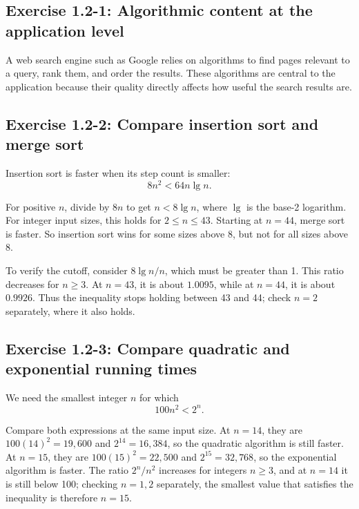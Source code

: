 \documentclass[11pt]{article}
\begin{document}
\subsection*{Exercise 1.2-1: Algorithmic content at the application level}

A web search engine such as Google relies on algorithms to find pages relevant
to a query, rank them, and order the results. These algorithms are central to
the application because their quality directly affects how useful the search
results are.

\subsection*{Exercise 1.2-2: Compare insertion sort and merge sort}

Insertion sort is faster when its step count is smaller:
\begin{equation*}
    8n^2 < 64n \lg n.
\end{equation*}

For positive $n$, divide by $8n$ to get $n < 8\lg n$, where $\lg$ is the
base-2 logarithm. For integer input sizes, this holds for $2 \le n \le 43$.
Starting at $n=44$, merge sort is faster. So insertion sort wins for some sizes
above 8, but not for all sizes above 8.

To verify the cutoff, consider $8\lg n/n$, which must be greater than 1. This
ratio decreases for $n \ge 3$. At $n=43$, it is about $1.0095$, while at
$n=44$, it is about $0.9926$. Thus the inequality stops holding between 43 and
44; check $n=2$ separately, where it also holds.

\subsection*{Exercise 1.2-3: Compare quadratic and exponential running times}

We need the smallest integer $n$ for which
\begin{equation*}
    100n^2 < 2^n.
\end{equation*}

Compare both expressions at the same input size. At $n=14$, they are
$100(14)^2=19{,}600$ and $2^{14}=16{,}384$, so the quadratic algorithm is
still faster. At $n=15$, they are $100(15)^2=22{,}500$ and
$2^{15}=32{,}768$, so the exponential algorithm is faster. The ratio
$2^n/n^2$ increases for integers $n \ge 3$, and at $n=14$ it is still below
100; checking $n=1,2$ separately, the smallest value that satisfies the
inequality is therefore $n=15$.
\end{document}
